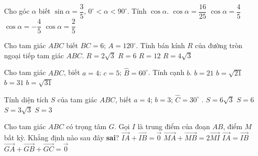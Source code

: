 \begin{ex}%
Cho góc $\alpha$ biết $\sin\alpha=\dfrac{3}{5}$, $0^{\circ}<\alpha<90^{\circ}$. Tính $\cos\alpha$.
		\choice
	{$\cos\alpha=\dfrac{16}{25}$}
	{\True $\cos\alpha=\dfrac{4}{5}$}
	{$\cos\alpha=-\dfrac{4}{5}$}
	{$\cos\alpha=\dfrac{2}{5}$}
\end{ex}

\begin{ex}%
Cho tam giác $ABC$ biết $BC=6$; $A=120^{\circ}$. Tính bán kính $R$ của đường tròn ngoại tiếp tam giác $ABC$.
		\choice
	{\True $R=2\sqrt{3}$}
	{$R=6$}
	{$R=12$}
	{$R=4\sqrt{3}$}
\end{ex}

\begin{ex}%
Cho tam giác $ABC$, biết $a=4$; $c=5$; $\widehat{B}=60^{\circ}$. Tính cạnh $b$.
		\choice
	{$b=21$}
	{\True $b=\sqrt{21}$}
	{$b=31$}
	{$b=\sqrt{31}$}
\end{ex}

\begin{ex}%
Tính diện tích $S$ của tam giác $ABC$, biết $a=4$; $b=3$; $\widehat{C}=30^{\circ}$ .
		\choice
	{$S=6\sqrt{3}$}
	{$S=6$}
	{$S=3\sqrt{3}$}
	{\True $S=3$}
\end{ex}

\begin{ex}%
Cho tam giác $ABC$ có trọng tâm $G$. Gọi $I$ là trung điểm của đoạn $AB$, điểm $M$ bất kỳ. Khẳng định nào sau đây \textbf{sai}?
		\choice
	{$\overrightarrow{IA}+\overrightarrow{IB}=\overrightarrow{0}$}
	{$\overrightarrow{MA}+\overrightarrow{MB}=2\overrightarrow{MI}$}
	{\True $\overrightarrow{IA}=\overrightarrow{IB}$}
	{$\overrightarrow{GA}+\overrightarrow{GB}+\overrightarrow{GC}=\overrightarrow{0}$}
\end{ex}

